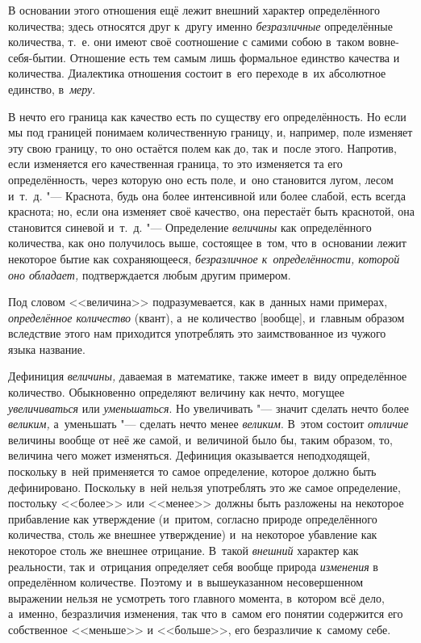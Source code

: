 В основании этого отношения ещё лежит внешний характер определённого
количества; здесь относятся друг к~другу именно {\em безразличные}
определённые количества, т.~е. они имеют своё соотношение
с самими собою в~таком вовне-себя-бытии.
Отношение есть тем самым лишь формальное единство качества
и количества. Диалектика отношения состоит в~его переходе в~их абсолютное
единство, в~{\em меру}.

\subremark{}

В нечто его граница как качество есть по существу его определённость. Но если
мы под границей понимаем количественную границу, и, например, поле изменяет эту
свою границу, то оно остаётся полем как до, так и~после этого. Напротив, если
изменяется его качественная граница, то это изменяется та его определённость,
через которую оно есть поле, и~оно становится лугом, лесом и~т.~д. "---
Краснота, будь она более интенсивной или более слабой, есть всегда краснота;
но, если она изменяет своё качество, она перестаёт быть краснотой, она
становится синевой и~т.~д. "--- Определение {\em величины} как определённого
количества, как оно получилось выше, состоящее в~том, что в~основании лежит
некоторое бытие как сохраняющееся, {\em безразличное к~определённости, которой
оно обладает,} подтверждается любым другим примером.

Под словом <<величина>> подразумевается, как в~данных нами примерах,
{\em определённое количество} (квант), а~не количество [вообще], и~главным
образом вследствие этого нам приходится употреблять это заимствованное из
чужого языка название.

Дефиниция {\em величины,} даваемая в~математике, также имеет в~виду
определённое количество. Обыкновенно определяют величину как нечто, могущее
{\em увеличиваться} или {\em уменьшаться}. Но увеличивать "--- значит сделать
нечто более {\em великим,} а~уменьшать "--- сделать нечто менее {\em великим}.
В~этом состоит {\em отличие} величины вообще от неё же самой, и~величиной было
бы, таким образом, то, величина чего может изменяться. Дефиниция оказывается
неподходящей, поскольку в~ней применяется то самое определение, которое должно
быть дефинировано. Поскольку в~ней нельзя употреблять это же самое определение,
постольку <<более>> или <<менее>> должны быть разложены на некоторое
прибавление как утверждение (и~притом, согласно природе определённого
количества, столь же внешнее утверждение) и~на некоторое убавление как
некоторое столь же внешнее отрицание. В~такой {\em внешний} характер как
реальности, так и~отрицания определяет себя вообще природа {\em изменения}
в определённом количестве. Поэтому и~в вышеуказанном несовершенном выражении
нельзя не усмотреть того главного момента, в~котором всё дело, а~именно,
безразличия изменения, так что в~самом его понятии содержится его собственное
<<меньше>> и <<больше>>, его безразличие к~самому себе.

